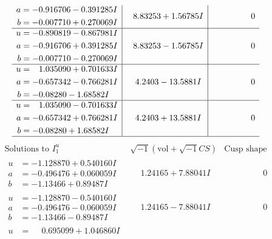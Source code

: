 \documentclass[1p]{elsarticle_modified}
\theoremstyle{definition}
\newcommand{\I}{\sqrt{-1}}
\begin{document}
$$\begin{array}{c|c|c}
\begin{aligned}
a &= -0.916706 - 0.391285 I \\
b &= -0.007710 + 0.270069 I\end{aligned}
 & \phantom{-}8.83253 + 1.56785 I & \phantom{-0.000000 } 0 \\ \hline\begin{aligned}
u &= -0.890819 - 0.867981 I \\
a &= -0.916706 + 0.391285 I \\
b &= -0.007710 - 0.270069 I\end{aligned}
 & \phantom{-}8.83253 - 1.56785 I & \phantom{-0.000000 } 0 \\ \hline\begin{aligned}
u &= \phantom{-}1.035090 + 0.701633 I \\
a &= -0.657342 - 0.766281 I \\
b &= -0.08280 - 1.68582 I\end{aligned}
 & \phantom{-}4.2403 - 13.5881 I & \phantom{-0.000000 } 0 \\ \hline\begin{aligned}
u &= \phantom{-}1.035090 - 0.701633 I \\
a &= -0.657342 + 0.766281 I \\
b &= -0.08280 + 1.68582 I\end{aligned}
 & \phantom{-}4.2403 + 13.5881 I & \phantom{-0.000000 } 0\\
 \hline 
 \end{array}$$\newpage$$\begin{array}{c|c|c}  
\text{Solutions to }I^u_{1}& \I (\text{vol} + \sqrt{-1}CS) & \text{Cusp shape}\\
 \hline 
\begin{aligned}
u &= -1.128870 + 0.540160 I \\
a &= -0.496476 + 0.060059 I \\
b &= -1.13466 + 0.89487 I\end{aligned}
 & \phantom{-}1.24165 + 7.88041 I & \phantom{-0.000000 } 0 \\ \hline\begin{aligned}
u &= -1.128870 - 0.540160 I \\
a &= -0.496476 - 0.060059 I \\
b &= -1.13466 - 0.89487 I\end{aligned}
 & \phantom{-}1.24165 - 7.88041 I & \phantom{-0.000000 } 0 \\ \hline\begin{aligned}
u &= \phantom{-}0.695099 + 1.046860 I \\

\end{aligned}
\end{array}$$
\end{document}
